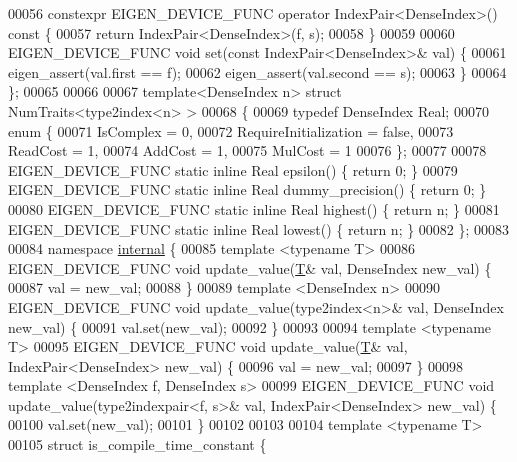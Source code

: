 \begin{DoxyCode}
00056   constexpr EIGEN\_DEVICE\_FUNC \textcolor{keyword}{operator} IndexPair<DenseIndex>() \textcolor{keyword}{const} \{
00057     \textcolor{keywordflow}{return} IndexPair<DenseIndex>(f, s);
00058   \}
00059 
00060   EIGEN\_DEVICE\_FUNC \textcolor{keywordtype}{void} \textcolor{keyword}{set}(\textcolor{keyword}{const} IndexPair<DenseIndex>& val) \{
00061     eigen\_assert(val.first == f);
00062     eigen\_assert(val.second == s);
00063   \}
00064 \};
00065 
00066 
00067 \textcolor{keyword}{template}<DenseIndex n> \textcolor{keyword}{struct }NumTraits<type2index<n> >
00068 \{
00069   \textcolor{keyword}{typedef} DenseIndex Real;
00070   \textcolor{keyword}{enum} \{
00071     IsComplex = 0,
00072     RequireInitialization = \textcolor{keyword}{false},
00073     ReadCost = 1,
00074     AddCost = 1,
00075     MulCost = 1
00076   \};
00077 
00078   EIGEN\_DEVICE\_FUNC \textcolor{keyword}{static} \textcolor{keyword}{inline} Real epsilon() \{ \textcolor{keywordflow}{return} 0; \}
00079   EIGEN\_DEVICE\_FUNC \textcolor{keyword}{static} \textcolor{keyword}{inline} Real dummy\_precision() \{ \textcolor{keywordflow}{return} 0; \}
00080   EIGEN\_DEVICE\_FUNC \textcolor{keyword}{static} \textcolor{keyword}{inline} Real highest() \{ \textcolor{keywordflow}{return} n; \}
00081   EIGEN\_DEVICE\_FUNC \textcolor{keyword}{static} \textcolor{keyword}{inline} Real lowest() \{ \textcolor{keywordflow}{return} n; \}
00082 \};
00083 
00084 \textcolor{keyword}{namespace }\hyperlink{namespaceinternal}{internal} \{
00085 \textcolor{keyword}{template} <\textcolor{keyword}{typename} T>
00086 EIGEN\_DEVICE\_FUNC \textcolor{keywordtype}{void} update\_value(\hyperlink{group___sparse_core___module_class_eigen_1_1_triplet}{T}& val, DenseIndex new\_val) \{
00087   val = new\_val;
00088 \}
00089 \textcolor{keyword}{template} <DenseIndex n>
00090 EIGEN\_DEVICE\_FUNC \textcolor{keywordtype}{void} update\_value(type2index<n>& val, DenseIndex new\_val) \{
00091   val.set(new\_val);
00092 \}
00093 
00094 \textcolor{keyword}{template} <\textcolor{keyword}{typename} T>
00095 EIGEN\_DEVICE\_FUNC \textcolor{keywordtype}{void} update\_value(\hyperlink{group___sparse_core___module_class_eigen_1_1_triplet}{T}& val, IndexPair<DenseIndex> new\_val) \{
00096   val = new\_val;
00097 \}
00098 \textcolor{keyword}{template} <DenseIndex f, DenseIndex s>
00099 EIGEN\_DEVICE\_FUNC \textcolor{keywordtype}{void} update\_value(type2indexpair<f, s>& val, IndexPair<DenseIndex> new\_val) \{
00100   val.set(new\_val);
00101 \}
00102 
00103 
00104 \textcolor{keyword}{template} <\textcolor{keyword}{typename} T>
00105 \textcolor{keyword}{struct }is\_compile\_time\_constant \{

\end{DoxyCode}
